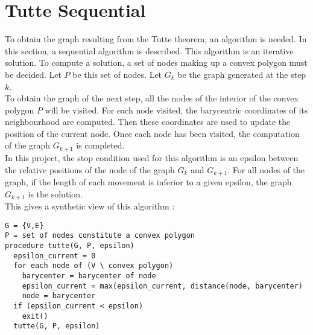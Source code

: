 \section{Tutte Sequential}

To obtain the graph resulting from the Tutte theorem, an algorithm is
needed. In this section, a sequential algorithm is described. This
algorithm is an iterative solution. To compute a solution, a set of nodes
 making up a convex polygon must be decided. Let $P$ be this set of nodes. Let
$G_k$ be the graph generated at the step $k$.
\\

To obtain the graph of the next step, all the nodes of the interior of the
convex polygon $P$ will be visited. For each node visited, the barycentric
coordinates of its neighbourhood are computed. Then these coordinates are used
to update the position of the current node. Once each node has been visited,
the computation of the graph $G_{k+1}$ is completed.
\\
In this project, the stop condition used for this algorithm is an epsilon
between the relative positions of the node of the graph $G_k$ and
$G_{k+1}$. For all nodes of the graph, if the length of each movement is
inferior to a given epsilon, the graph $G_{k+1}$ is the solution.
\\

This gives a synthetic view of this algorithm : 
\begin{verbatim}
G = {V,E}
P = set of nodes constitute a convex polygon
procedure tutte(G, P, epsilon)
  epsilon_current = 0
  for each node of (V \ convex polygon)
    barycenter = barycenter of node
    epsilon_current = max(epsilon_current, distance(node, barycenter)
    node = barycenter
  if (epsilon_current < epsilon)
    exit()
  tutte(G, P, epsilon)
\end{verbatim}


